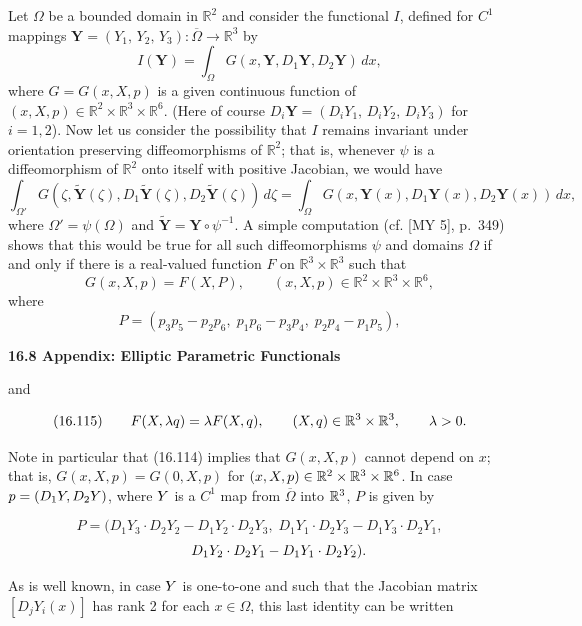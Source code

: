 Let $\Omega$ be a bounded domain in $\mathbb{R}^2$ and consider the functional $I$, defined for $C^1$ mappings $\mathbf{Y}=(Y_1,\,Y_2,\,Y_3): \overline{\Omega}\to \mathbb{R}^3$ by
\[
I(\mathbf{Y})=\int_\Omega G(x,\mathbf{Y},D_1\mathbf{Y},D_2\mathbf{Y})\,dx,
\tag{16.113}
\]
where $G=G(x,X,p)$ is a given continuous function of $(x,X,p)\in \mathbb{R}^2\times \mathbb{R}^3\times \mathbb{R}^6$.
(Here of course $D_i\mathbf{Y}=(D_iY_1,\,D_iY_2,\,D_iY_3)$ for $i=1,2$). Now let us consider the
possibility that $I$ remains invariant under orientation preserving diffeomorphisms
of $\mathbb{R}^2$; that is, whenever $\psi$ is a diffeomorphism of $\mathbb{R}^2$ onto itself with positive
Jacobian, we would have
\[
\int_{\Omega'} G(\zeta,\widetilde{\mathbf{Y}}(\zeta),D_1\widetilde{\mathbf{Y}}(\zeta),D_2\widetilde{\mathbf{Y}}(\zeta))\,d\zeta
=\int_\Omega G(x,\mathbf{Y}(x),D_1\mathbf{Y}(x),D_2\mathbf{Y}(x))\,dx,
\]
where $\Omega'=\psi(\Omega)$ and $\widetilde{\mathbf{Y}}=\mathbf{Y}\circ \psi^{-1}$. A simple computation (cf. [MY 5], p.\ 349)
shows that this would be true for all such diffeomorphisms $\psi$ and domains $\Omega$ if
and only if there is a real-valued function $F$ on $\mathbb{R}^3\times \mathbb{R}^3$ such that
\[
G(x,X,p)=F(X,P), \qquad (x,X,p)\in \mathbb{R}^2\times \mathbb{R}^3\times \mathbb{R}^6,
\tag{16.114}
\]
where
\[
P=(p_3p_5-p_2p_6,\; p_1p_6-p_3p_4,\; p_2p_4-p_1p_5),
\]



\pagestyle{empty}



\noindent\textbf{16.8 Appendix: Elliptic Parametric Functionals}

\medskip

and

\[
(16.115)\qquad F(X,\lambda q)=\lambda F(X,q), \qquad (X,q)\in\mathbb{R}^3\times\mathbb{R}^3,\qquad \lambda>0.
\]

Note in particular that (16.114) implies that $G(x,X,p)$ cannot depend on $x$; that
is, $G(x,X,p)=G(0,X,p)$ for $(x,X,p)\in\mathbb{R}^2\times\mathbb{R}^3\times\mathbb{R}^6$. In case $p=(D_1Y,D_2Y)$,
where $Y$ is a $C^1$ map from $\overline{\Omega}$ into $\mathbb{R}^3$, $P$ is given by

\[
P=(D_1Y_3\cdot D_2Y_2-D_1Y_2\cdot D_2Y_3,\; D_1Y_1\cdot D_2Y_3-D_1Y_3\cdot D_2Y_1,
\]
\[
\hphantom{P=(}\; D_1Y_2\cdot D_2Y_1-D_1Y_1\cdot D_2Y_2).
\]

As is well known, in case $Y$ is one-to-one and such that the Jacobian matrix
$[D_jY_i(x)]$ has rank 2 for each $x\in\Omega$, this last identity can be written


